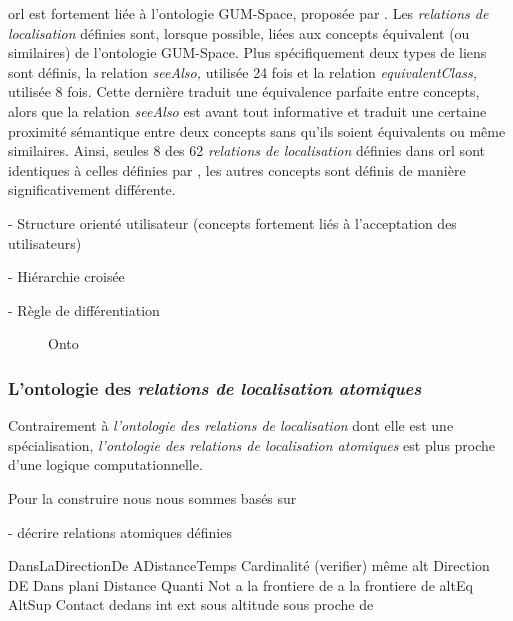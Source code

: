 \ac{orl} est fortement liée à l'ontologie GUM-Space, proposée par
\textcite{Bateman2010}. Les \emph{relations de localisation} définies
sont, lorsque possible, liées aux concepts équivalent (ou similaires)
de l'ontologie GUM-Space. Plus spécifiquement deux types de liens sont
définis, la relation \emph{seeAlso,} utilisée 24 fois et la relation
\emph{equivalentClass,} utilisée 8 fois. Cette dernière traduit une
équivalence parfaite entre concepts, alors que la relation
\emph{seeAlso} est avant tout informative et traduit une certaine
proximité sémantique entre deux concepts sans qu'ils soient
équivalents ou même similaires. Ainsi, seules 8 des 62 \emph{relations
  de localisation} définies dans \ac{orl} sont identiques à celles
définies par \textcite{Bateman2010}, les autres concepts sont définis
de manière significativement différente.


- Structure orienté utilisateur (concepts fortement liés à
l'acceptation des utilisateurs)

- Hiérarchie croisée

- Règle de différentiation

\begin{figure}
  \centering
  \caption{Onto}
  \label{fig:ontho}
\end{figure}

\subsubsection{L'ontologie des \emph{relations de localisation atomiques}}

Contrairement à \emph{l'ontologie des relations de localisation} dont
elle est une spécialisation, \emph{l'ontologie des relations de
  localisation atomiques} est plus proche d'une logique
computationnelle.

Pour la construire nous nous sommes basés sur

- décrire relations atomiques définies

DansLaDirectionDe
ADistanceTemps
Cardinalité (verifier)
même alt
Direction DE
Dans plani
Distance Quanti
Not a la frontiere de
a la frontiere de
altEq
AltSup
Contact
dedans
int
ext
sous altitude
sous proche de 

